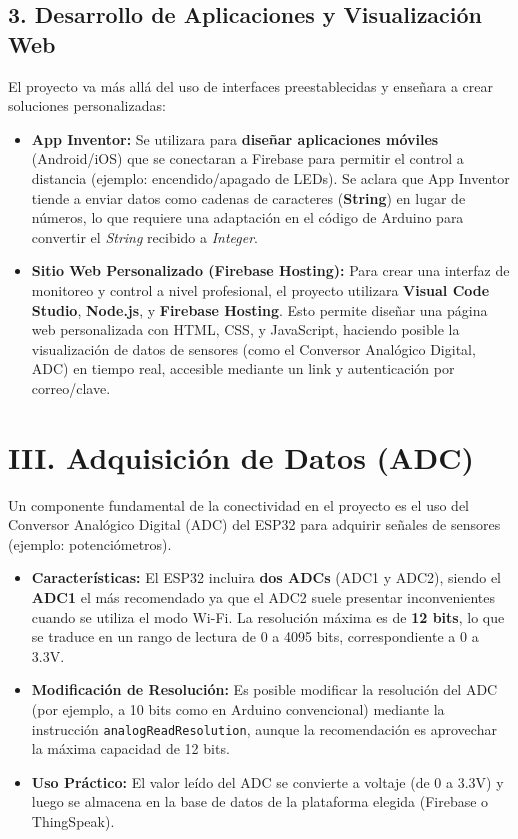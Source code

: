 \documentclass{article}
\begin{document}
\subsection*{3. Desarrollo de Aplicaciones y Visualización Web}
El proyecto va más allá del uso de interfaces preestablecidas y enseñara 
a crear soluciones personalizadas:
\begin{itemize}
    \item \textbf{App Inventor:} Se utilizara para 
    \textbf{diseñar aplicaciones móviles} (Android/iOS) que se conectaran 
    a Firebase para permitir el control a distancia 
    (ejemplo: encendido/apagado de LEDs). Se aclara que App Inventor 
    tiende a enviar datos como cadenas de caracteres (\textbf{String}) 
    en lugar de números, lo que requiere una adaptación en el código de 
    Arduino para convertir el \textit{String} recibido a 
    \textit{Integer}.
    \item \textbf{Sitio Web Personalizado (Firebase Hosting):} Para crear 
    una interfaz de monitoreo y control a nivel profesional, el 
    proyecto utilizara \textbf{Visual Code Studio}, \textbf{Node.js}, y 
    \textbf{Firebase Hosting}. Esto permite diseñar una página web 
    personalizada con HTML, CSS, y JavaScript, haciendo posible la 
    visualización de datos de sensores (como el Conversor Analógico 
    Digital, ADC) en tiempo real, accesible mediante un link y 
    autenticación por correo/clave.
\end{itemize}

\section*{III. Adquisición de Datos (ADC)}

Un componente fundamental de la conectividad en el proyecto es el uso 
del Conversor Analógico Digital (ADC) del ESP32 para adquirir señales 
de sensores (ejemplo: potenciómetros).
\begin{itemize}
    \item \textbf{Características:} El ESP32 incluira \textbf{dos ADCs} 
    (ADC1 y ADC2), siendo el \textbf{ADC1} el más recomendado ya que el 
    ADC2 suele presentar inconvenientes cuando se utiliza el modo Wi-Fi. 
    La resolución máxima es de \textbf{12 bits}, lo que se traduce 
    en un rango de lectura de 0 a 4095 bits, correspondiente a 0 a 3.3V.
    \item \textbf{Modificación de Resolución:} Es posible modificar la 
    resolución del ADC (por ejemplo, a 10 bits como en Arduino 
    convencional) mediante la instrucción \texttt{analogReadResolution}, 
    aunque la recomendación es aprovechar la máxima capacidad de 12 bits.
    \item \textbf{Uso Práctico:} El valor leído del ADC se convierte a 
    voltaje (de 0 a 3.3V) y luego se almacena en la base de datos de 
    la plataforma elegida (Firebase o ThingSpeak).
\end{itemize}
\end{document}

